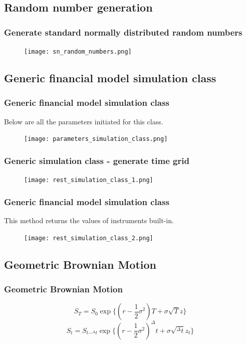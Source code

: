 \documentclass{beamer}
\begin{document}
\subsection{Random number generation}

\begin{frame}
\frametitle{Generate standard normally distributed random numbers}
\begin{figure}[H]
	\texttt{[image: sn\_random\_numbers.png]}
\end{figure}
\end{frame}

\subsection{Generic financial model simulation class}

\begin{frame}
\frametitle{Generic financial model simulation class}
Below are all the parameters initiated for this class.
\begin{figure}[H]
	\texttt{[image: parameters\_simulation\_class.png]}
\end{figure}
\end{frame}

\begin{frame}
\frametitle{Generic simulation class - generate time grid}
\begin{figure}[H]
	\texttt{[image: rest\_simulation\_class\_1.png]}
\end{figure}
\end{frame}

\begin{frame}
\frametitle{Generic financial model simulation class}
This method returns the values of instruments built-in.
\begin{figure}[H]
	\texttt{[image: rest\_simulation\_class\_2.png]}
\end{figure}
\end{frame}

\subsection{Geometric Brownian Motion}
\begin{frame}
\frametitle{Geometric Brownian Motion}
$$S_{T} = S_{0}\exp\{(r-\frac{1}{2}\sigma^{2})T + \sigma\sqrt{T}z\}$$
$$S_{t} = S_{t-^{\Delta}t}\exp\{(r-\frac{1}{2}\sigma^{2})^{\Delta}t + \sigma\sqrt{^{\Delta}t}z_{t}\}$$
\end{frame}
\end{document}
